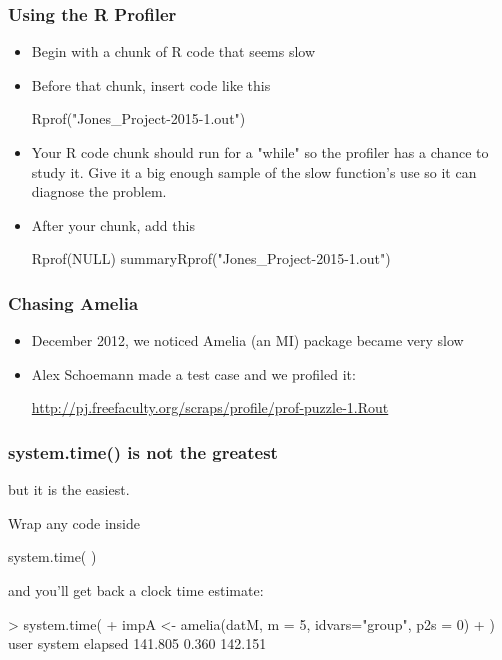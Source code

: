 \documentclass[10pt,english]{beamer}
\begin{document}
\begin{frame}
  \frametitle{Using the R Profiler}
  \begin{itemize}
    \item Begin with a chunk of R code that seems slow
    \item Before that chunk, insert code like this
 \begin{Sinput}
 Rprof("Jones_Project-2015-1.out")  
 \end{Sinput}
    \item Your R code chunk should run for a "while" so the profiler
      has a chance to study it. Give it a big enough sample of the
      slow function's use so it can diagnose the problem.
     \item After your chunk, add this
 \begin{Sinput}
 Rprof(NULL)
 summaryRprof("Jones_Project-2015-1.out")  
 \end{Sinput}
\end{itemize}
\end{frame}


\begin{frame}
  \frametitle{Chasing Amelia}
  \begin{itemize}
    \item December 2012, we noticed Amelia (an MI) package became very slow
    \item Alex Schoemann made a test case and we profiled it:
      
   \url{http://pj.freefaculty.org/scraps/profile/prof-puzzle-1.Rout}
   
   
 \end{itemize}
\end{frame}


\begin{frame}
  \frametitle{system.time() is not the greatest}
  but it is the easiest.
  
  Wrap any code inside
  
  system.time( )
  
  and you'll get back a clock time estimate:
\begin{Sinput}
  > system.time(
+     impA <- amelia(datM, m = 5, idvars="group", p2s = 0)
+     )
   user  system elapsed 
141.805   0.360 142.151 
\end{Sinput}  
\end{frame}
\end{document}
